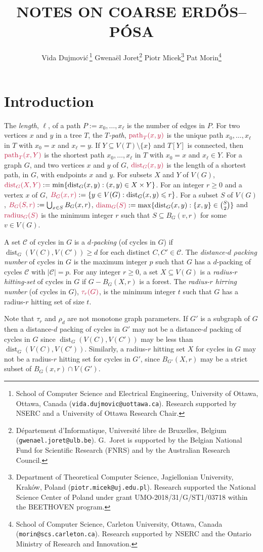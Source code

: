 \documentclass{patmorin}
\title{\MakeUppercase{Notes on Coarse {E}rdős–{P}ósa}}
\author{
 Vida Dujmovi{\'c}\,\footnote{School of Computer Science and Electrical Engineering, University of Ottawa, Ottawa, Canada (\texttt{vida.dujmovic@uottawa.ca}). Research supported by NSERC and a University of Ottawa Research Chair.}
 \qquad
 Gwena\"el Joret\footnote{D\'epartement d'Informatique, Universit\'e libre de Bruxelles, Belgium ({\tt gwenael.joret@ulb.be}). G.\ Joret is supported by the Belgian National Fund for Scientific Research (FNRS) and by the Australian Research Council.}
 \qquad
 Piotr Micek\footnote{Department of Theoretical Computer Science, Jagiellonian University, Kraków, Poland (\texttt{piotr.micek@uj.edu.pl}). Research supported
 the National Science Center of Poland under grant UMO-2018/31/G/ST1/03718 within the BEETHOVEN program.}
 \qquad
 Pat Morin\footnote{School of Computer Science, Carleton University, Ottawa, Canada (\texttt{morin@scs.carleton.ca}). Research supported by NSERC and the Ontario Ministry of Research and Innovation.}}
\date{}
\makeatletter
\renewcommand{\ge}{\geqslant}
\renewcommand{\le}{\leqslant}
\newcommand{\defin}[1]{\emph{\textcolor{brightmaroon}{#1}}}
\def\mathcolor#1#{\@mathcolor{#1}}
\def\@mathcolor#1#2#3{%
  \protect\leavevmode
  \begingroup
    \color#1{#2}#3%
  \endgroup
}
\newcommand{\mathdefin}[1]{\mathcolor{brightmaroon}{#1}}
\DeclareMathOperator{\diam}{diam}
\DeclareMathOperator{\radius}{radius}
\DeclareMathOperator{\pth}{path}
\DeclareMathOperator{\dist}{dist}
\makeatother
\begin{document}
\maketitle

\section{Introduction}

The \defin{length}, $\ell$, of a path $P:=x_0,\ldots,x_\ell$ is the number of edges in $P$.  For two vertices $x$ and $y$ in a  tree $T$, the \defin{$T$-path}, $\mathdefin{\pth_T(x,y)}$ is the unique path $x_0,\ldots,x_\ell$ in $T$ with $x_0=x$ and $x_\ell=y$. If $Y\subseteq V(T)\setminus\{x\}$ and $T[Y]$ is connected, then $\mathdefin{\pth_T(x,Y)}$ is the shortest path $x_0,\ldots,x_{\ell}$ in $T$ with $x_0=x$ and $x_\ell\in Y$.  For a graph $G$, and two vertices $x$ and $y$ of $G$, $\mathdefin{\dist_G(x,y)}$ is the length of a shortest path, in $G$, with endpoints $x$ and $y$.  For subsets $X$ and $Y$ of $V(G)$, $\mathdefin{\dist_G(X,Y)}:=\min\{\dist_G(x,y):(x,y)\in X\times Y\}$.  For an integer $r\ge 0$ and a vertex $x$ of $G$, $\mathdefin{B_G(x,r)}:=\{y\in V(G):\dist_G(x,y)\le r\}$.  For a subset $S$ of $V(G)$, $\mathdefin{B_G(S,r)}:=\bigcup_{x\in S}B_G(x,r)$, $\mathdefin{\diam_G(S)}:=\max\{\dist_G(x,y):\{x,y\}\in\binom{S}{2}\}$ and $\mathdefin{\radius_G(S)}$ is the minimum integer $r$ such that $S\subseteq B_G(v,r)$ for some $v\in V(G)$.

A set $\mathcal{C}$ of cycles in $G$ is a \defin{$d$-packing} (of cycles in $G$) if $\dist_G(V(C),V(C'))\ge d$ for each distinct $C,C'\in\mathcal{C}$.
The \defin{distance-$d$ $\rho$acking number} of cycles in $G$ is the maximum integer $p$ such that $G$ has a $d$-packing of cycles $\mathcal{C}$ with $|\mathcal{C}|=p$.    For any integer $r\ge 0$, a set $X\subseteq V(G)$ is a \defin{radius-$r$ hitting-set} of cycles in $G$ if $G-B_G(X,r)$ is a forest.  The \defin{radius-$r$ hi$\tau$$\tau$ing number} (of cycles in $G$), $\mathdefin{\tau_r(G)}$, is the minimum integer $t$ such that $G$ has a radius-$r$ hitting set of size $t$.

Note that $\tau_r$ and $\rho_d$ are not monotone graph parameters.  If $G'$ is a subgraph of $G$ then a distance-$d$ packing of cycles in $G'$ may not be a distance-$d$ packing of cycles in $G$ since $\dist_{G}(V(C),V(C'))$ may be less than $\dist_G(V(C),V(C'))$.  Similarly, a radius-$r$ hitting set $X$ for cycles in $G$ may not be a radius-$r$ hitting set for cycles in $G'$, since $B_{G'}(X,r)$ may be a strict subset of $B_{G}(x,r)\cap V(G')$.
\end{document}
